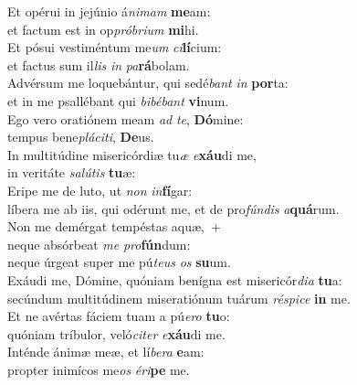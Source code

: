 \oddverse Et opérui in jejúnio á\textit{ni}\textit{mam} \textbf{me}am:~\*\\
\oddverse et factum est in op\textit{pró}\textit{bri}\textit{um} \textbf{mi}hi.\\
\evenverse Et pósui vestiméntum me\textit{um} \textit{ci}\textbf{lí}cium:~\*\\
\evenverse et factus sum il\textit{lis} \textit{in} \textit{pa}\textbf{rá}bolam.\\
\oddverse Advérsum me loquebántur, qui sedé\textit{bant} \textit{in} \textbf{por}ta:~\*\\
\oddverse et in me psallébant qui \textit{bi}\textit{bé}\textit{bant} \textbf{vi}num.\\
\evenverse Ego vero oratiónem meam \textit{ad} \textit{te}, \textbf{Dó}mine:~\*\\
\evenverse tempus bene\textit{plá}\textit{ci}\textit{ti}, \textbf{De}us.\\
\oddverse In multitúdine misericórdiæ tu\textit{æ} \textit{e}\textbf{xáu}di me,~\*\\
\oddverse in veritáte \textit{sa}\textit{lú}\textit{tis} \textbf{tu}æ:\\
\evenverse Eripe me de luto, ut \textit{non} \textit{in}\textbf{fí}gar:~\*\\
\evenverse líbera me ab iis, qui odérunt me, et de pro\textit{fún}\textit{dis} \textit{a}\textbf{quá}rum.\\
\oddverse Non me demérgat tempéstas aquæ,~+\\
\oddverse  neque absórbeat \textit{me} \textit{pro}\textbf{fún}dum:~\*\\
\oddverse neque úrgeat super me pú\textit{te}\textit{us} \textit{os} \textbf{su}um.\\
\evenverse Exáudi me, Dómine, quóniam benígna est misericór\textit{di}\textit{a} \textbf{tu}a:~\*\\
\evenverse secúndum multitúdinem miseratiónum tuárum \textit{ré}\textit{spi}\textit{ce} \textbf{in} me.\\
\oddverse Et ne avértas fáciem tuam a pú\textit{e}\textit{ro} \textbf{tu}o:~\*\\
\oddverse quóniam tríbulor, veló\textit{ci}\textit{ter} \textit{e}\textbf{xáu}di me.\\
\evenverse Inténde ánimæ meæ, et lí\textit{be}\textit{ra} \textbf{e}am:~\*\\
\evenverse propter inimícos me\textit{os} \textit{é}\textit{ri}\textbf{pe} me.\\
